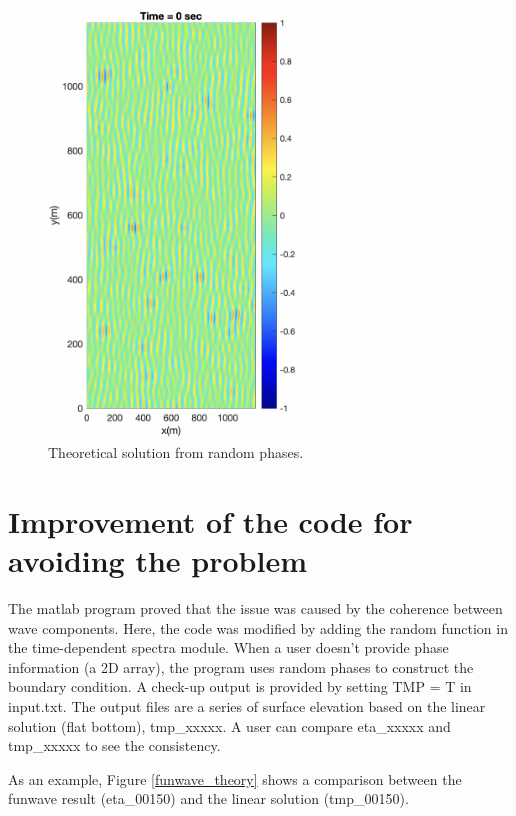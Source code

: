 \documentclass[preprint,10pt]{elsarticle}
\begin{document}
  \begin{figure}
\begin{center}
 \includegraphics[width=0.6\textwidth]{figures/rand_phase.png}
 \caption{Theoretical solution from random phases.}
 \label{rand_phase}
 \end{center}
 \end{figure}
 
 \section{Improvement of the code for avoiding the problem}
 The matlab program proved that the issue was caused by the coherence between wave components. Here, the code was modified by adding the random function in the time-dependent spectra module. When a user doesn't provide phase information (a 2D array), the program uses random phases to construct the boundary condition. A check-up output is provided by setting TMP = T in input.txt. The output files are a series of surface elevation based on the linear solution (flat bottom), tmp\_xxxxx. A user can compare eta\_xxxxx and tmp\_xxxxx to see the consistency. 
 
 As an example, Figure \ref{funwave_theory} shows a comparison between the funwave result (eta\_00150) and the linear solution (tmp\_00150). 
 
\end{document}
